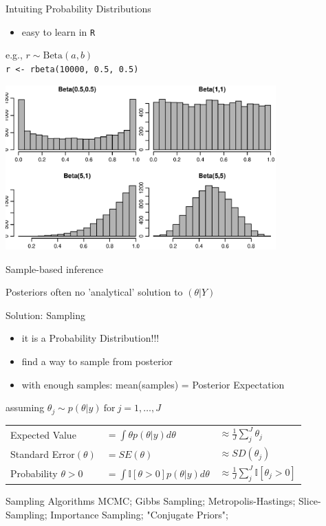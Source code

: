\documentclass[presentation,9pt,xcolor=dvipsnames]{beamer}
\begin{document}
\begin{frame}[fragile,label={sec:org4a0236b}]{Intuiting Probability Distributions}
 \begin{itemize}
\item easy to learn in \texttt{R} \\
\end{itemize}
e.g., \(r\sim\text{Beta}(a,b)\) \\
\texttt{r <- rbeta(10000, 0.5, 0.5)}
\begin{center}
\includegraphics[width=0.78\textwidth,height=0.78\textheight]{beta.eps}
\end{center}
\end{frame}
\begin{frame}[label={sec:orgaaafd85}]{Sample-based inference}
\begin{block}{Posteriors}
often no 'analytical' solution to \((\theta\vert Y)\)
\end{block}
\begin{block}{Solution: \alert{Sampling}}
\begin{itemize}
\item it is a Probability Distribution!!!
\item find a way to sample from posterior
\item with enough samples: mean(samples) = Posterior Expectation
\end{itemize}
assuming \(\theta_j\sim p(\theta\vert y)\ \text{for}\ j=1,\dots,J\)
\begin{center}
\begin{tabular}{lll}
Expected Value & \(=\int\theta p(\theta\vert y)d\theta\) & \(\approx\frac{1}{J}\sum_j^J\theta_j\)\\
Standard Error\((\theta)\) & \(=SE(\theta)\) & \(\approx SD(\theta_j)\)\\
Probability \(\theta>0\) & \(=\int\mathbb{I}[\theta>0]p(\theta\vert y)d\theta\) & \(\approx\frac{1}{J}\sum_j^J\mathbb{I}[\theta_j>0]\)\\
\end{tabular}
\end{center}
\end{block}

\begin{block}{Sampling Algorithms}
MCMC; Gibbs Sampling; Metropolis-Hastings; Slice-Sampling; Importance Sampling; "Conjugate Priors";
\end{block}
\end{frame}
\end{document}
